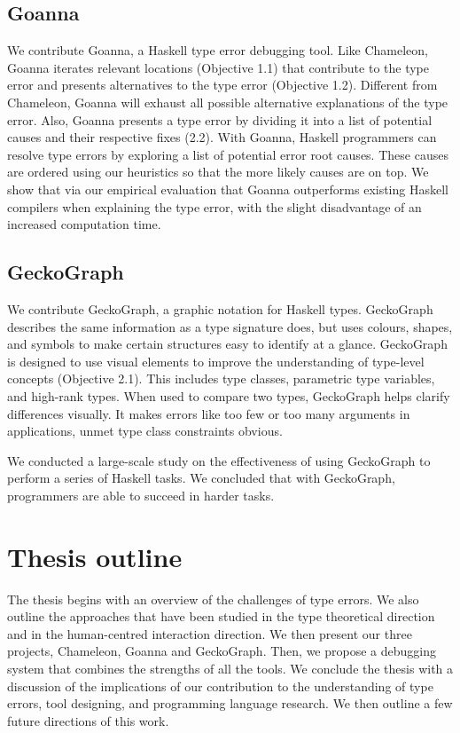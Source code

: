 \subsection{Goanna}
We contribute Goanna, a Haskell type error debugging tool. Like Chameleon, Goanna iterates relevant locations (Objective 1.1) that contribute to the type error and presents alternatives to the type error (Objective 1.2). Different from Chameleon, Goanna will exhaust all possible alternative explanations of the type error. Also, Goanna presents a type error by dividing it into a list of potential causes and their respective fixes (2.2). With Goanna, Haskell programmers can resolve type errors by exploring a list of potential error root causes. These causes are ordered using our heuristics so that the more likely causes are on top. We show that via our empirical evaluation that Goanna outperforms existing Haskell compilers when explaining the type error, with the slight disadvantage of an increased computation time.

\subsection{GeckoGraph}

We contribute GeckoGraph, a graphic notation for Haskell types. GeckoGraph describes the same information as a type signature does, but uses colours, shapes, and symbols to make certain structures easy to identify at a glance. GeckoGraph is designed to use visual elements to improve the understanding of type-level concepts (Objective 2.1). This includes type classes, parametric type variables, and high-rank types. When used to compare two types, GeckoGraph helps clarify differences visually. It makes errors like too few or too many arguments in applications, unmet type class constraints obvious.


We conducted a large-scale study on the effectiveness of using GeckoGraph to perform a series of Haskell tasks. We concluded that with GeckoGraph, programmers are able to succeed in harder tasks.


\section{Thesis outline}

The thesis begins with an overview of the challenges of type errors. We also outline the approaches that have been studied in the type theoretical direction and in the human-centred interaction direction. We then present our three projects, Chameleon, Goanna and GeckoGraph. Then, we propose a debugging system that combines the strengths of all the tools. We conclude the thesis with a discussion of the implications of our contribution to the understanding of type errors, tool designing, and programming language research. We then outline a few future directions of this work.

